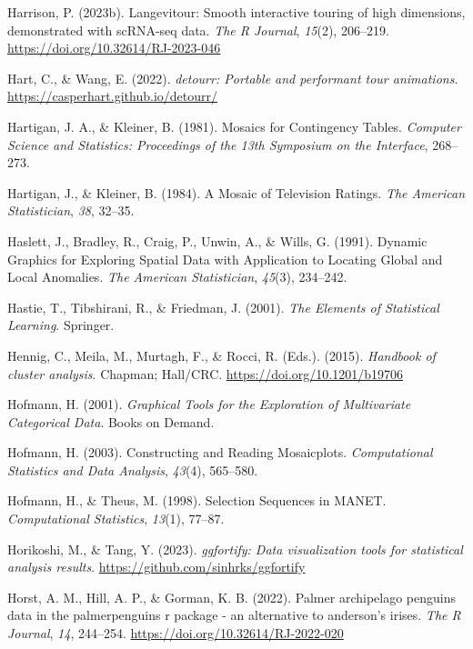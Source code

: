 \documentclass[
  letterpaper,
]{krantz}
\newlength{\cslhangindent}
\newenvironment{CSLReferences}[2] %
 {\begin{list}{}{%
  \setlength{\itemindent}{0pt}
  \setlength{\leftmargin}{0pt}
  \setlength{\parsep}{0pt}
  \ifodd #1
   \setlength{\leftmargin}{\cslhangindent}
   \setlength{\itemindent}{-1\cslhangindent}
  \fi
  \setlength{\itemsep}{#2\baselineskip}}}
 {\end{list}}
\begin{document}
\begin{CSLReferences}{1}{0}
Harrison, P. (2023b). Langevitour: Smooth interactive touring of high
dimensions, demonstrated with scRNA-seq data. \emph{The R Journal},
\emph{15}(2), 206--219. \url{https://doi.org/10.32614/RJ-2023-046}

Hart, C., \& Wang, E. (2022). \emph{{detourr}: Portable and performant
tour animations}. \url{https://casperhart.github.io/detourr/}

Hartigan, J. A., \& Kleiner, B. (1981). Mosaics for {C}ontingency
{T}ables. \emph{Computer Science and Statistics: Proceedings of the 13th
Symposium on the Interface}, 268--273.

Hartigan, J., \& Kleiner, B. (1984). A {M}osaic of {T}elevision
{R}atings. \emph{The American Statistician}, \emph{38}, 32--35.

Haslett, J., Bradley, R., Craig, P., Unwin, A., \& Wills, G. (1991).
{D}ynamic {G}raphics for {E}xploring {S}patial {D}ata with {A}pplication
to {L}ocating {G}lobal and {L}ocal {A}nomalies. \emph{The American
Statistician}, \emph{45}(3), 234--242.

Hastie, T., Tibshirani, R., \& Friedman, J. (2001). \emph{The {E}lements
of {S}tatistical {L}earning}. Springer.

Hennig, C., Meila, M., Murtagh, F., \& Rocci, R. (Eds.). (2015).
\emph{Handbook of cluster analysis}. Chapman; Hall/{CRC}.
\url{https://doi.org/10.1201/b19706}

Hofmann, H. (2001). \emph{Graphical {T}ools for the {E}xploration of
{M}ultivariate {C}ategorical {D}ata}. Books on Demand.

Hofmann, H. (2003). Constructing and {R}eading {M}osaicplots.
\emph{Computational Statistics and Data Analysis}, \emph{43}(4),
565--580.

Hofmann, H., \& Theus, M. (1998). Selection {S}equences in {MANET}.
\emph{Computational Statistics}, \emph{13}(1), 77--87.

Horikoshi, M., \& Tang, Y. (2023). \emph{{ggfortify}: Data visualization
tools for statistical analysis results}.
\url{https://github.com/sinhrks/ggfortify}

Horst, A. M., Hill, A. P., \& Gorman, K. B. (2022). Palmer archipelago
penguins data in the palmerpenguins r package - an alternative to
anderson's irises. \emph{The R Journal}, \emph{14}, 244--254.
\url{https://doi.org/10.32614/RJ-2022-020}


\end{CSLReferences}
\end{document}
